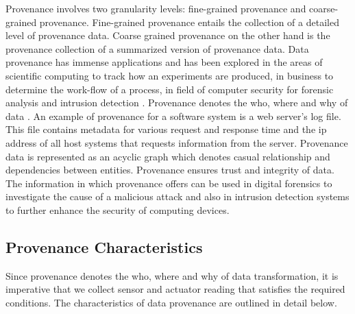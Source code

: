 Provenance involves two granularity levels: fine-grained provenance and coarse-grained provenance. Fine-grained provenance \cite{glavic_case_2011} entails the collection of a detailed level of provenance data. Coarse grained provenance on the other hand is the provenance collection of a summarized version of provenance data. Data provenance has immense applications and has been explored in the areas of scientific computing \cite{groth, altintas} to track how an experiments are produced, in business to determine the work-flow of  a process, in field of computer security for forensic analysis and intrusion detection \cite{bates_towards_2013, muniswamy_reddy_provenance_2010, muniswamy_reddy} . Provenance denotes the who, where and why of data \cite{cheney_provenance_2009}. An example of provenance for a software system is a web server's log file. This file contains metadata for various request and response time and the ip address of all host systems that requests information from the server. Provenance data is represented as an acyclic graph which denotes casual relationship and dependencies between entities. Provenance ensures trust and integrity of data. The information in which provenance offers can be used in digital forensics to investigate the cause of a malicious attack and also in intrusion detection systems to further enhance the security of computing devices. 





\subsection{Provenance Characteristics}

Since provenance denotes the who, where and why of data transformation, it is imperative that we collect sensor and actuator reading that satisfies the required conditions. The characteristics of data provenance are outlined in detail below.


